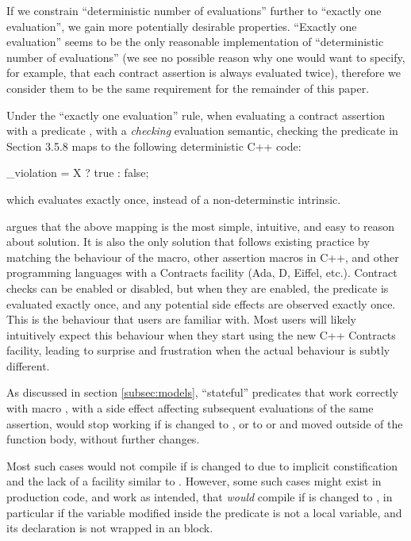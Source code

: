 If we constrain ``deterministic number of evaluations'' further to ``exactly one evaluation'', we gain more potentially desirable properties. ``Exactly one evaluation'' seems to be the only reasonable implementation of ``deterministic number of evaluations'' (we see no possible reason why one would want to specify, for example, that each contract assertion is always evaluated twice), therefore we consider them to be the same requirement for the remainder of this paper.

Under the ``exactly one evaluation'' rule, when evaluating a contract assertion with a predicate , with a  \emph{checking} evaluation semantic, checking the predicate in \cite{P2900R6} Section 3.5.8 maps to the following deterministic C++ code:
\begin{codeblock}
_violation = X ? true : false;
\end{codeblock}
which evaluates  exactly once, instead of a non-determinstic \emph{}\tcode{)} intrinsic.

\cite{P2756R0} argues that the above mapping is the most simple, intuitive, and easy to reason about solution. It is also the only solution that follows existing practice by matching the behaviour of the  macro, other assertion macros in C++, and other programming languages with a Contracts facility (Ada, D, Eiffel, etc.). Contract checks can be enabled or disabled, but when they are enabled, the predicate is evaluated exactly once, and any potential side effects are observed exactly once. This is the behaviour that users are familiar with. Most users will likely intuitively expect this behaviour when they start using the new C++ Contracts facility, leading to surprise and frustration when the actual behaviour is subtly different.

As discussed in section \ref{subsec:models}, ``stateful'' predicates that work correctly with macro , with a side effect affecting subsequent evaluations of the same assertion, would stop working if  is changed to , or to  or  and moved outside of the function body, without further changes.

Most such cases would not compile if  is changed to  due to implicit constification and the lack of a facility similar to . However, some such cases might exist in production code, and work as intended, that \emph{would} compile if  is changed to \mbox{}, in particular if the variable modified inside the predicate is not a local variable, and its declaration is not wrapped in an  block.

